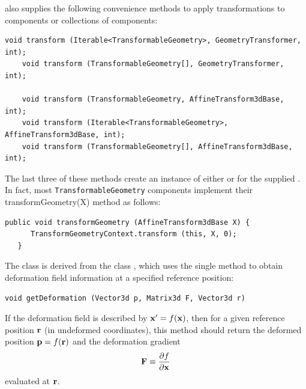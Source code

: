  also
supplies the following convenience methods to apply transformations to
components or collections of components:
\begin{lstlisting}[]
    void transform (Iterable<TransformableGeometry>, GeometryTransformer, int);
    void transform (TransformableGeometry[], GeometryTransformer, int);

    void transform (TransformableGeometry, AffineTransform3dBase, int);
    void transform (Iterable<TransformableGeometry>, AffineTransform3dBase, int);
    void transform (TransformableGeometry[], AffineTransform3dBase, int);
\end{lstlisting}
%
The last three of these methods create an instance of either
 or
 for the supplied
. In fact, most
{\tt TransformableGeometry} components implement their
%
{transformGeometry(X)} method as follows:
%
\begin{lstlisting}[]
   public void transformGeometry (AffineTransform3dBase X) {
      TransformGeometryContext.transform (this, X, 0);
   }
\end{lstlisting}
%

The 
class is derived from the
class , which uses
the single method
 to
obtain deformation field information at a specified reference position:
\begin{lstlisting}[]
    void getDeformation (Vector3d p, Matrix3d F, Vector3d r)
\end{lstlisting}
%
If the deformation field is described by ${\bf x}' = f({\bf x})$, then
for a given reference position ${\bf r}$ (in undeformed coordinates),
this method should return the deformed position ${\bf p} = f({\bf r})$
and the deformation gradient
%
\begin{equation}
{\bf F} \equiv \frac{\partial f}{\partial {\bf x}}
\end{equation}
%
evaluated at ${\bf r}$. 

